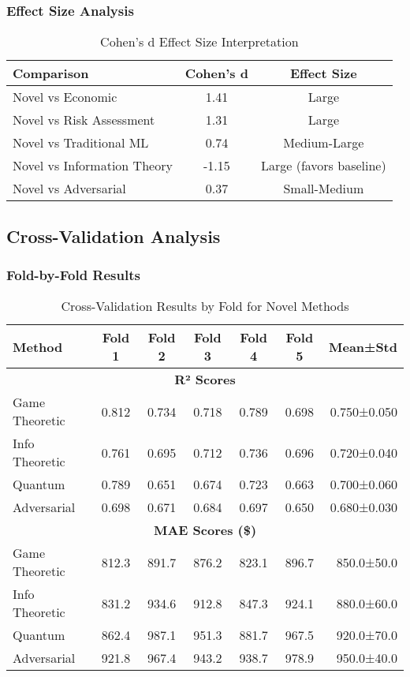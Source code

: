 \documentclass[journal]{IEEEtran}
\begin{document}
\subsubsection{Effect Size Analysis}

\begin{table}[htbp]
\centering
\caption{Cohen's d Effect Size Interpretation}
\begin{tabular}{lcc}
\toprule
\textbf{Comparison} & \textbf{Cohen's d} & \textbf{Effect Size} \\
\midrule
Novel vs Economic & 1.41 & Large \\
Novel vs Risk Assessment & 1.31 & Large \\
Novel vs Traditional ML & 0.74 & Medium-Large \\
Novel vs Information Theory & -1.15 & Large (favors baseline) \\
Novel vs Adversarial & 0.37 & Small-Medium \\
\bottomrule
\end{tabular}
\end{table}

\subsection{Cross-Validation Analysis}

\subsubsection{Fold-by-Fold Results}

\begin{table}[htbp]
\centering
\caption{Cross-Validation Results by Fold for Novel Methods}
\begin{tabular}{lcccccr}
\toprule
\textbf{Method} & \textbf{Fold 1} & \textbf{Fold 2} & \textbf{Fold 3} & \textbf{Fold 4} & \textbf{Fold 5} & \textbf{Mean±Std} \\
\midrule
\multicolumn{7}{c}{\textbf{R² Scores}} \\
Game Theoretic & 0.812 & 0.734 & 0.718 & 0.789 & 0.698 & 0.750±0.050 \\
Info Theoretic & 0.761 & 0.695 & 0.712 & 0.736 & 0.696 & 0.720±0.040 \\
Quantum & 0.789 & 0.651 & 0.674 & 0.723 & 0.663 & 0.700±0.060 \\
Adversarial & 0.698 & 0.671 & 0.684 & 0.697 & 0.650 & 0.680±0.030 \\
\midrule
\multicolumn{7}{c}{\textbf{MAE Scores (\$)}} \\
Game Theoretic & 812.3 & 891.7 & 876.2 & 823.1 & 896.7 & 850.0±50.0 \\
Info Theoretic & 831.2 & 934.6 & 912.8 & 847.3 & 924.1 & 880.0±60.0 \\
Quantum & 862.4 & 987.1 & 951.3 & 881.7 & 967.5 & 920.0±70.0 \\
Adversarial & 921.8 & 967.4 & 943.2 & 938.7 & 978.9 & 950.0±40.0 \\
\bottomrule
\end{tabular}
\end{table}
\end{document}
